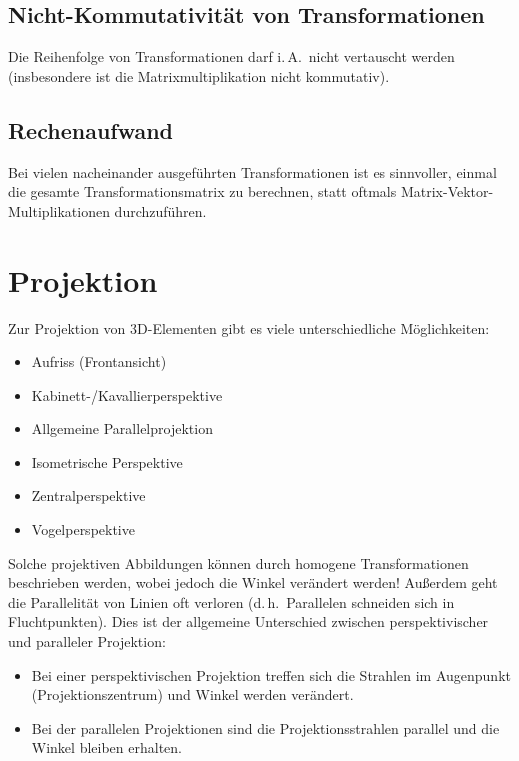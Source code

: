 \documentclass[a4paper, 11pt, accentcolor = tud3b]{tudreport}
\renewcommand{\dh}{d.\,h.~}
\newcommand{\iA}{i.\,A.~}
\begin{document}
			\subsection{Nicht-Kommutativität von Transformationen}
				Die Reihenfolge von Transformationen darf \iA nicht vertauscht werden (insbesondere ist die Matrixmultiplikation nicht kommutativ).

			\subsection{Rechenaufwand}
				Bei vielen nacheinander ausgeführten Transformationen ist es sinnvoller, einmal die gesamte Transformationsmatrix zu berechnen, statt oftmals Matrix-Vektor-Multiplikationen durchzuführen.

		\section{Projektion}
			\label{sec:projection}
			
			Zur Projektion von 3D-Elementen gibt es viele unterschiedliche Möglichkeiten:
			\begin{itemize}
				\item Aufriss (Frontansicht)
				\item Kabinett-/Kavallierperspektive
				\item Allgemeine Parallelprojektion
				\item Isometrische Perspektive
				\item Zentralperspektive
				\item Vogelperspektive
			\end{itemize}
		
			Solche projektiven Abbildungen können durch homogene Transformationen beschrieben werden, wobei jedoch die Winkel verändert werden! Außerdem geht die Parallelität von Linien oft verloren (\dh Parallelen schneiden sich in Fluchtpunkten). Dies ist der allgemeine Unterschied zwischen perspektivischer und paralleler Projektion:
			\begin{itemize}
				\item Bei einer perspektivischen Projektion treffen sich die Strahlen im Augenpunkt (Projektionszentrum) und Winkel werden verändert.
				\item Bei der parallelen Projektionen sind die Projektionsstrahlen parallel und die Winkel bleiben erhalten.
			\end{itemize}
\end{document}
